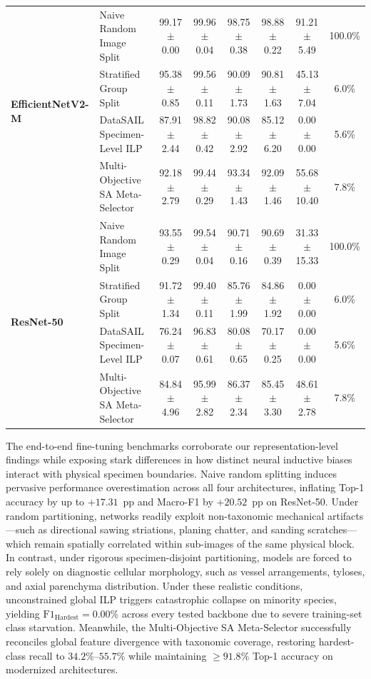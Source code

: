 \documentclass[a4paper,fleqn]{cas-sc}
\begin{document}
\begin{table}[pos=htbp]
{\begin{tabular}{llcccccc}
\midrule
\multirow{4}{*}{\textbf{EfficientNetV2-M}~\cite{efficientnetv2}} & Naive Random Image Split & 99.17 $\pm$ 0.00 & 99.96 $\pm$ 0.04 & 98.75 $\pm$ 0.38 & 98.88 $\pm$ 0.22 & 91.21 $\pm$ 5.49 & 100.0\% \\
 & Stratified Group Split & 95.38 $\pm$ 0.85 & 99.56 $\pm$ 0.11 & 90.09 $\pm$ 1.73 & 90.81 $\pm$ 1.63 & 45.13 $\pm$ 7.04 & 6.0\% \\
 & DataSAIL Specimen-Level ILP & 87.91 $\pm$ 2.44 & 98.82 $\pm$ 0.42 & 90.08 $\pm$ 2.92 & 85.12 $\pm$ 6.20 & 0.00 $\pm$ 0.00 & 5.6\% \\
 & Multi-Objective SA Meta-Selector & 92.18 $\pm$ 2.79 & 99.44 $\pm$ 0.29 & 93.34 $\pm$ 1.43 & 92.09 $\pm$ 1.46 & 55.68 $\pm$ 10.40 & 7.8\% \\
\midrule
\multirow{4}{*}{\textbf{ResNet-50}~\cite{resnet}} & Naive Random Image Split & 93.55 $\pm$ 0.29 & 99.54 $\pm$ 0.04 & 90.71 $\pm$ 0.16 & 90.69 $\pm$ 0.39 & 31.33 $\pm$ 15.33 & 100.0\% \\
 & Stratified Group Split & 91.72 $\pm$ 1.34 & 99.40 $\pm$ 0.11 & 85.76 $\pm$ 1.99 & 84.86 $\pm$ 1.92 & 0.00 $\pm$ 0.00 & 6.0\% \\
 & DataSAIL Specimen-Level ILP & 76.24 $\pm$ 0.07 & 96.83 $\pm$ 0.61 & 80.08 $\pm$ 0.65 & 70.17 $\pm$ 0.25 & 0.00 $\pm$ 0.00 & 5.6\% \\
 & Multi-Objective SA Meta-Selector & 84.84 $\pm$ 4.96 & 95.99 $\pm$ 2.82 & 86.37 $\pm$ 2.34 & 85.45 $\pm$ 3.30 & 48.61 $\pm$ 2.78 & 7.8\% \\
\bottomrule
\end{tabular}%
}
\end{table}

The end-to-end fine-tuning benchmarks corroborate our representation-level findings while exposing stark differences in how distinct neural inductive biases interact with physical specimen boundaries. Naive random splitting induces pervasive performance overestimation across all four architectures, inflating Top-1 accuracy by up to $+17.31$~pp and Macro-F1 by $+20.52$~pp on ResNet-50. Under random partitioning, networks readily exploit non-taxonomic mechanical artifacts—such as directional sawing striations, planing chatter, and sanding scratches—which remain spatially correlated within sub-images of the same physical block. In contrast, under rigorous specimen-disjoint partitioning, models are forced to rely solely on diagnostic cellular morphology, such as vessel arrangements, tyloses, and axial parenchyma distribution. Under these realistic conditions, unconstrained global ILP triggers catastrophic collapse on minority species, yielding $\mathrm{F1}_{\text{Hardest}} = 0.00\%$ across every tested backbone due to severe training-set class starvation. Meanwhile, the Multi-Objective SA Meta-Selector successfully reconciles global feature divergence with taxonomic coverage, restoring hardest-class recall to $34.2\%$--$55.7\%$ while maintaining $\ge 91.8\%$ Top-1 accuracy on modernized architectures.
\end{document}
